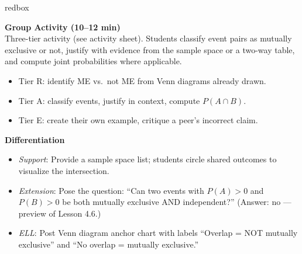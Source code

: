 \documentclass[10pt]{article}
\begin{document}
\begin{skillbox}{redbox}
\begin{minipage}[t]{0.48\linewidth}
    \textbf{Group Activity (10--12 min)}\\
    Three-tier activity (see activity sheet). Students classify event pairs as
    mutually exclusive or not, justify with evidence from the sample space or
    a two-way table, and compute joint probabilities where applicable.
    \begin{itemize}
        \item Tier R: identify ME vs.\ not ME from Venn diagrams already drawn.
        \item Tier A: classify events, justify in context, compute $P(A \cap B)$.
        \item Tier E: create their own example, critique a peer's incorrect claim.
    \end{itemize}
\end{minipage}
\hfill
\begin{minipage}[t]{0.48\linewidth}
    \textbf{Differentiation}
    \begin{itemize}
        \item \textit{Support}: Provide a sample space list; students circle shared
              outcomes to visualize the intersection.
        \item \textit{Extension}: Pose the question: ``Can two events with
              $P(A) > 0$ and $P(B) > 0$ be both mutually exclusive AND
              independent?'' (Answer: no --- preview of Lesson 4.6.)
        \item \textit{ELL}: Post Venn diagram anchor chart with labels
              ``Overlap = NOT mutually exclusive'' and ``No overlap = mutually exclusive.''
    \end{itemize}
\end{minipage}
\end{skillbox}
\end{document}
